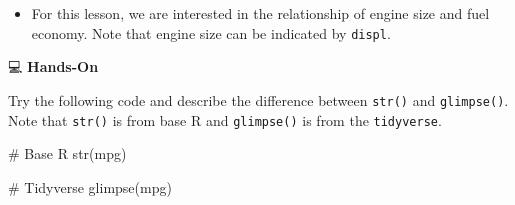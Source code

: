 \documentclass[
  letterpaper,
  DIV=11,
  numbers=noendperiod]{scrreprt}
\newenvironment{Shaded}{\begin{snugshade}}{\end{snugshade}}
\newcommand{\CommentTok}[1]{\textcolor[rgb]{0.37,0.37,0.37}{#1}}
\newcommand{\FunctionTok}[1]{\textcolor[rgb]{0.28,0.35,0.67}{#1}}
\newcommand{\NormalTok}[1]{\textcolor[rgb]{0.00,0.23,0.31}{#1}}
\providecommand{\tightlist}{%
  \setlength{\itemsep}{0pt}\setlength{\parskip}{0pt}}\usepackage{longtable,booktabs,array}
\begin{document}
\begin{itemize}
\tightlist
\item
  For this lesson, we are interested in the relationship of engine size
  and fuel economy. Note that engine size can be indicated by
  \texttt{displ}.
\end{itemize}

💻 \textbf{Hands-On}

Try the following code and describe the difference between
\texttt{str()} and \texttt{glimpse()}. Note that \texttt{str()} is from
base R and \texttt{glimpse()} is from the \texttt{tidyverse}.

\begin{Shaded}
\begin{Highlighting}[]
\CommentTok{\# Base R}
\FunctionTok{str}\NormalTok{(mpg)}

\CommentTok{\# Tidyverse}
\FunctionTok{glimpse}\NormalTok{(mpg)}
\end{Highlighting}
\end{Shaded}
\end{document}
